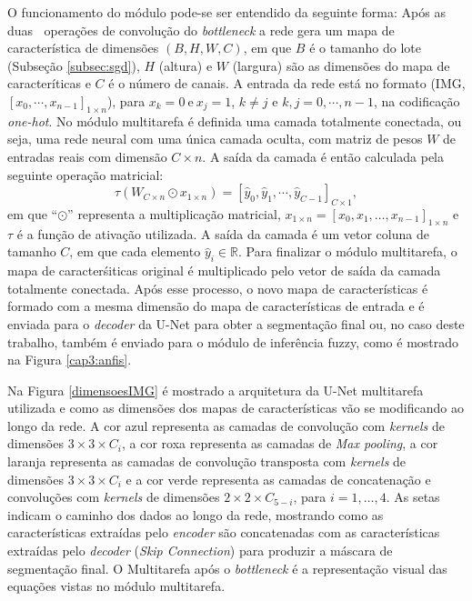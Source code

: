 O funcionamento do módulo pode-se ser entendido da seguinte forma: Após as duas $\ $ operações de convolução do \textit{bottleneck} a rede gera um mapa de característica de dimensões $(B, H, W, C)$, em que $B$ é o tamanho do lote (Subseção \ref{subsec:sgd}), $H$ (altura) e $W$ (largura) são as dimensões do mapa de caracteríticas e $C$ é o número de canais. A entrada da rede está no formato (IMG, $[x_0, \cdots,x_{n-1}]_{1 \times n}$), para $x_k = 0 \ \text{e} \ x_j = 1$, $k \neq j$ e $k, j = 0, \cdots, n-1$, na codificação \textit{one-hot}. No módulo multitarefa é definida uma camada totalmente conectada, ou seja, uma rede neural com uma única camada oculta, com matriz de pesos $W$ de entradas reais com dimensão $C \times n$. A saída da camada é então calculada pela seguinte operação matricial:
$$
\tau\left( W_{C\times n}\odot x_{1\times n}\right) = [\hat{y}_0, \hat{y}_1, \cdots, \hat{y}_{C-1}]_{C \times 1},
$$ 
em que ``$\odot$'' representa a multiplicação matricial, $x_{1 \times n} = [x_0, x_1, \hdots, x_{n-1}]_{1 \times n}$ e $\tau$ é a função de ativação utilizada. A saída da camada é um vetor coluna de tamanho $C$, em que cada elemento $\hat{y}_i \in \mathbb{R}$. Para finalizar o módulo multitarefa, o mapa de caracterśiticas original é multiplicado pelo vetor de saída da camada totalmente conectada. Após esse processo, o novo mapa de características é formado com a mesma dimensão do mapa de características de entrada e é enviada para o \textit{decoder} da U-Net para obter a segmentação final ou, no caso deste trabalho, também é enviado para o módulo de inferência fuzzy, como é mostrado na Figura \ref{cap3:anfis}.

Na Figura \ref{dimensoesIMG} é mostrado a arquitetura da U-Net multitarefa utilizada e como as dimensões dos mapas de características vão se modificando ao longo da rede.
A cor azul representa as camadas de convolução com \textit{kernels} de dimensões $3\times 3 \times C_i$, a cor roxa representa as camadas de \textit{Max pooling}, a cor laranja representa as camadas de convolução transposta com \textit{kernels} de dimensões $3\times 3 \times C_i$ e a cor verde representa as camadas de concatenação e convoluções com \textit{kernels} de dimensões $2\times 2 \times C_{5-i}$, para $i = 1, \hdots, 4$. As setas indicam o caminho dos dados ao longo da rede, mostrando como as características extraídas pelo \textit{encoder} são concatenadas com as características extraídas pelo \textit{decoder} (\textit{Skip Connection}) para produzir a máscara de segmentação final. O Multitarefa após o \textit{bottleneck} é a representação visual das equações vistas no módulo multitarefa.

